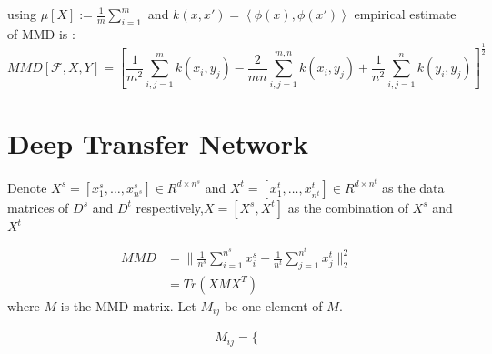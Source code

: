 using $\mu [X] := \frac{1}{m}\sum_{i=1}^m$ and $k(x,x')=\left\langle \phi(x),\phi(x') \right\rangle $
empirical estimate of MMD is :
\[ MMD[\mathcal{F},X,Y]=\left[ \frac{1}{m^2} \sum_{i,j=1}^m k(x_i,y_j) - \frac{2}{mn} \sum_{i,j=1}^{m,n} k(x_i,y_j) + \frac{1}{n^2} \sum_{i,j=1}^n k(y_i,y_j) \right]^{\frac{1}{2}} \]

\section{Deep Transfer Network}\cite{Deep Transfer Network}

Denote $X^s=[x^s_1,\dots,x^s_{n^s}] \in R^{d\times n^s}$ and 
$X^t=[x^t_1,\dots,x^t_{n^t}] \in R^{d \times n^t}$ as the data matrices of $D^s$ and $D^t$ respectively,$X=[X^s,X^t]$ as the combination of $X^s$ and $X^t$ \par
\begin{align}
MMD&=\|\frac{1}{n^s} \sum_{i=1}^{n^s}x_i^s - \frac{1}{n^t} \sum_{j=1}^{n^t}x_j^t \|^2_2\\
&=Tr(XMX^T)
\end{align}
where $M$ is the MMD matrix. Let $M_{ij}$ be one element of $M$.\par
\begin{align}
M_{ij}=\{
\end{align}